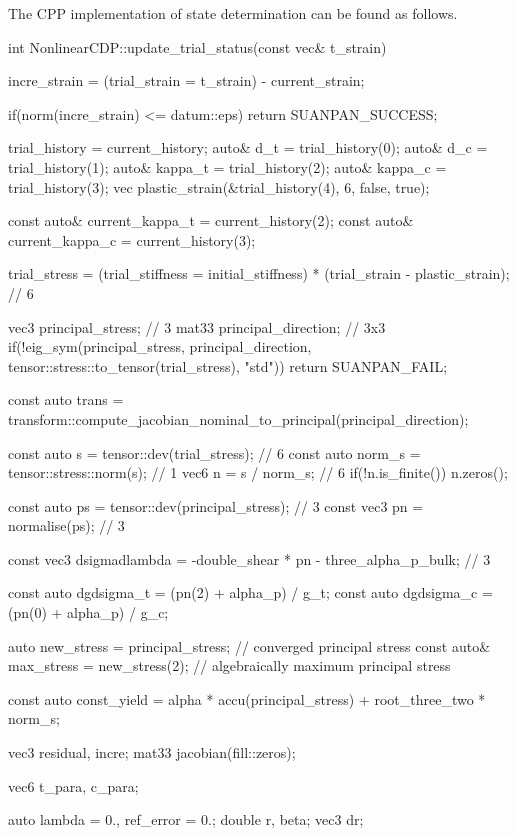 The CPP implementation of state determination can be found as follows.
\begin{cppcode}
int NonlinearCDP::update_trial_status(const vec& t_strain) {
    incre_strain = (trial_strain = t_strain) - current_strain;

    if(norm(incre_strain) <= datum::eps) return SUANPAN_SUCCESS;

    trial_history = current_history;
    auto& d_t = trial_history(0);
    auto& d_c = trial_history(1);
    auto& kappa_t = trial_history(2);
    auto& kappa_c = trial_history(3);
    vec plastic_strain(&trial_history(4), 6, false, true);

    const auto& current_kappa_t = current_history(2);
    const auto& current_kappa_c = current_history(3);

    trial_stress = (trial_stiffness = initial_stiffness) * (trial_strain - plastic_strain); // 6

    vec3 principal_stress;     // 3
    mat33 principal_direction; // 3x3
    if(!eig_sym(principal_stress, principal_direction, tensor::stress::to_tensor(trial_stress), "std")) return SUANPAN_FAIL;

    const auto trans = transform::compute_jacobian_nominal_to_principal(principal_direction);

    const auto s = tensor::dev(trial_stress);    // 6
    const auto norm_s = tensor::stress::norm(s); // 1
    vec6 n = s / norm_s;                         // 6
    if(!n.is_finite()) n.zeros();

    const auto ps = tensor::dev(principal_stress); // 3
    const vec3 pn = normalise(ps);                 // 3

    const vec3 dsigmadlambda = -double_shear * pn - three_alpha_p_bulk; // 3

    const auto dgdsigma_t = (pn(2) + alpha_p) / g_t;
    const auto dgdsigma_c = (pn(0) + alpha_p) / g_c;

    auto new_stress = principal_stress;     // converged principal stress
    const auto& max_stress = new_stress(2); // algebraically maximum principal stress

    const auto const_yield = alpha * accu(principal_stress) + root_three_two * norm_s;

    vec3 residual, incre;
    mat33 jacobian(fill::zeros);

    vec6 t_para, c_para;

    auto lambda = 0., ref_error = 0.;
    double r, beta;
    vec3 dr;

}
\end{cppcode}
